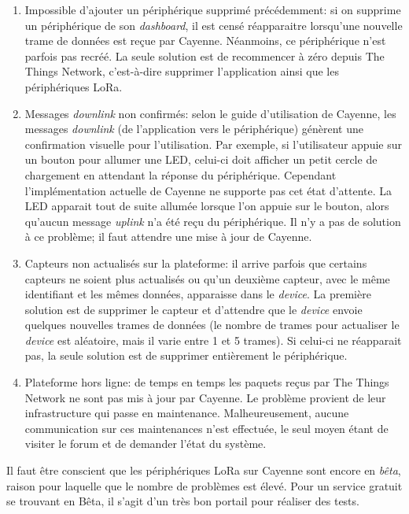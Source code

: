 \begin{enumerate}
    \item Impossible d'ajouter un périphérique supprimé précédemment: si on supprime un périphérique de son \textit{dashboard}, il est censé réapparaitre lorsqu'une nouvelle trame de données est reçue par Cayenne. Néanmoins, ce périphérique n'est parfois pas recréé. La seule solution est de recommencer à zéro depuis The Things Network, c'est-à-dire supprimer l'application ainsi que les périphériques LoRa.
    
    \item Messages \textit{downlink} non confirmés: selon le guide d'utilisation de Cayenne, les messages \textit{downlink} (de l'application vers le périphérique) génèrent une confirmation visuelle pour l'utilisation. Par exemple, si l'utilisateur appuie sur un bouton pour allumer une LED, celui-ci doit afficher un petit cercle de chargement en attendant la réponse du périphérique. Cependant l'implémentation actuelle de Cayenne ne supporte pas cet état d'attente. La LED apparait tout de suite allumée lorsque l'on appuie sur le bouton, alors qu'aucun message \textit{uplink} n'a été reçu du périphérique. Il n'y a pas de solution à ce problème; il faut attendre une mise à jour de Cayenne. 
    
    \item Capteurs non actualisés sur la plateforme: il arrive parfois que certains capteurs ne soient plus actualisés ou qu'un deuxième capteur, avec le même identifiant et les mêmes données, apparaisse dans le \textit{device}. La première solution est de supprimer le capteur et d'attendre que le \textit{device} envoie quelques nouvelles trames de données (le nombre de trames pour actualiser le \textit{device} est aléatoire, mais il varie entre 1 et 5 trames). Si celui-ci ne réapparait pas, la seule solution est de supprimer entièrement le périphérique. 
    
    \item Plateforme hors ligne: de temps en temps les paquets reçus par The Things Network ne sont pas mis à jour par Cayenne. Le problème provient de leur infrastructure qui passe en maintenance. Malheureusement, aucune communication sur ces maintenances n'est effectuée, le seul moyen étant de visiter le forum et de demander l'état du système. 
\end{enumerate}

Il faut être conscient que les périphériques LoRa sur Cayenne sont encore en \textit{bêta}, raison pour laquelle que le nombre de problèmes est élevé. Pour un service gratuit se trouvant en Bêta, il s'agit d'un très bon portail pour réaliser des tests.

